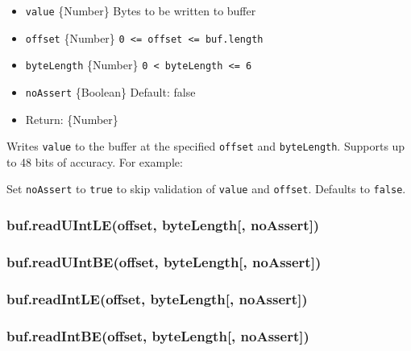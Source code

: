 \begin{itemize}
\itemsep1pt\parskip0pt
\item
  \texttt{value} \{Number\} Bytes to be written to buffer
\item
  \texttt{offset} \{Number\}
  \texttt{0\ \textless{}=\ offset\ \textless{}=\ buf.length}
\item
  \texttt{byteLength} \{Number\}
  \texttt{0\ \textless{}\ byteLength\ \textless{}=\ 6}
\item
  \texttt{noAssert} \{Boolean\} Default: false
\item
  Return: \{Number\}
\end{itemize}

Writes \texttt{value} to the buffer at the specified \texttt{offset} and
\texttt{byteLength}. Supports up to 48 bits of accuracy. For example:

\begin{Shaded}
\begin{Highlighting}[]
  \NormalTok{(}\NormalTok{);}
\NormalTok{(}\NormalTok{, }\NormalTok{, }\NormalTok{);}
\end{Highlighting}
\end{Shaded}

Set \texttt{noAssert} to \texttt{true} to skip validation of
\texttt{value} and \texttt{offset}. Defaults to \texttt{false}.

\subsubsection{buf.readUIntLE(offset, byteLength{[},
noAssert{]})}\label{buf.readuintleoffset-bytelength-noassert}

\subsubsection{buf.readUIntBE(offset, byteLength{[},
noAssert{]})}\label{buf.readuintbeoffset-bytelength-noassert}

\subsubsection{buf.readIntLE(offset, byteLength{[},
noAssert{]})}\label{buf.readintleoffset-bytelength-noassert}

\subsubsection{buf.readIntBE(offset, byteLength{[},
noAssert{]})}\label{buf.readintbeoffset-bytelength-noassert}

